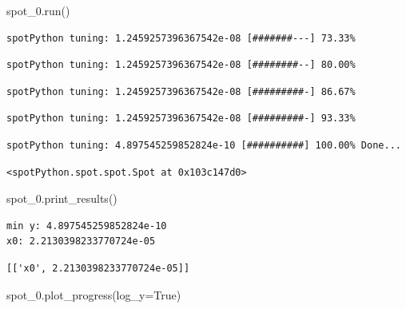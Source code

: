 \documentclass[
  letterpaper,
  DIV=11,
  numbers=noendperiod]{scrreprt}
\newenvironment{Shaded}{\begin{snugshade}}{\end{snugshade}}
\newcommand{\NormalTok}[1]{\textcolor[rgb]{0.00,0.23,0.31}{#1}}
\newcommand{\OperatorTok}[1]{\textcolor[rgb]{0.37,0.37,0.37}{#1}}
\newcommand{\VariableTok}[1]{\textcolor[rgb]{0.07,0.07,0.07}{#1}}
\begin{document}
\begin{Shaded}
\begin{Highlighting}[]
\NormalTok{spot\_0.run()}
\end{Highlighting}
\end{Shaded}

\begin{verbatim}
spotPython tuning: 1.2459257396367542e-08 [#######---] 73.33% 
\end{verbatim}

\begin{verbatim}
spotPython tuning: 1.2459257396367542e-08 [########--] 80.00% 
\end{verbatim}

\begin{verbatim}
spotPython tuning: 1.2459257396367542e-08 [#########-] 86.67% 
\end{verbatim}

\begin{verbatim}
spotPython tuning: 1.2459257396367542e-08 [#########-] 93.33% 
\end{verbatim}

\begin{verbatim}
spotPython tuning: 4.897545259852824e-10 [##########] 100.00% Done...
\end{verbatim}

\begin{verbatim}
<spotPython.spot.spot.Spot at 0x103c147d0>
\end{verbatim}

\begin{Shaded}
\begin{Highlighting}[]
\NormalTok{spot\_0.print\_results()}
\end{Highlighting}
\end{Shaded}

\begin{verbatim}
min y: 4.897545259852824e-10
x0: 2.2130398233770724e-05
\end{verbatim}

\begin{verbatim}
[['x0', 2.2130398233770724e-05]]
\end{verbatim}

\begin{Shaded}
\begin{Highlighting}[]
\NormalTok{spot\_0.plot\_progress(log\_y}\OperatorTok{=}\VariableTok{True}\NormalTok{)}
\end{Highlighting}
\end{Shaded}
\end{document}
